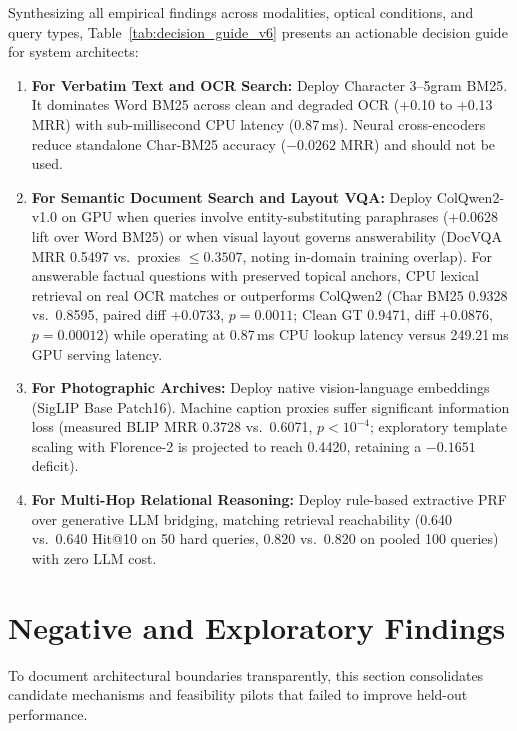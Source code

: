Synthesizing all empirical findings across modalities, optical conditions, and query types, Table~\ref{tab:decision_guide_v6} presents an actionable decision guide for system architects:
\begin{enumerate}
    \setlength{\itemsep}{0pt}
    \setlength{\parskip}{0pt}
    \setlength{\parsep}{0pt}
    \setlength{\topsep}{1pt}
    \item \textbf{For Verbatim Text and OCR Search:} Deploy Character 3--5gram BM25. It dominates Word BM25 across clean and degraded OCR (+0.10 to +0.13 MRR) with sub-millisecond CPU latency (0.87\,ms). Neural cross-encoders reduce standalone Char-BM25 accuracy ($-0.0262$ MRR) and should not be used.
    \item \textbf{For Semantic Document Search and Layout VQA:} Deploy ColQwen2-v1.0 on GPU when queries involve entity-substituting paraphrases (+0.0628 lift over Word BM25) or when visual layout governs answerability (DocVQA MRR 0.5497 vs.\ proxies $\le 0.3507$, noting in-domain training overlap). For answerable factual questions with preserved topical anchors, CPU lexical retrieval on real OCR matches or outperforms ColQwen2 (Char BM25 0.9328 vs.\ 0.8595, paired diff $+0.0733$, $p = 0.0011$; Clean GT 0.9471, diff $+0.0876$, $p=0.00012$) while operating at 0.87\,ms CPU lookup latency versus 249.21\,ms GPU serving latency.
    \item \textbf{For Photographic Archives:} Deploy native vision-language embeddings (SigLIP Base Patch16). Machine caption proxies suffer significant information loss (measured BLIP MRR 0.3728 vs.\ 0.6071, $p < 10^{-4}$; exploratory template scaling with Florence-2 is projected to reach 0.4420, retaining a $-0.1651$ deficit).
    \item \textbf{For Multi-Hop Relational Reasoning:} Deploy rule-based extractive PRF over generative LLM bridging, matching retrieval reachability (0.640 vs.\ 0.640 Hit@10 on 50 hard queries, 0.820 vs.\ 0.820 on pooled 100 queries) with zero LLM cost.
\end{enumerate}

\section{Negative and Exploratory Findings}
\label{sec:negative_findings}

To document architectural boundaries transparently, this section consolidates candidate mechanisms and feasibility pilots that failed to improve held-out performance.

